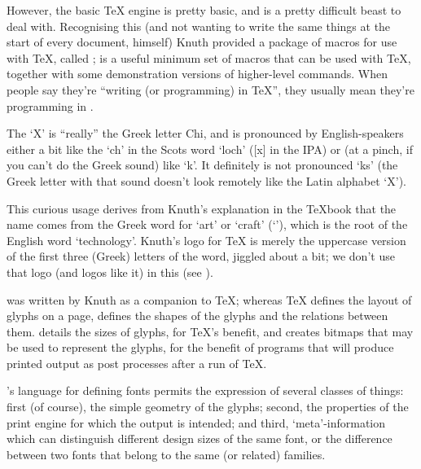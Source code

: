 However, the basic \TeX{} engine is pretty
basic, and is a pretty difficult beast to deal with. Recognising this
(and not wanting to write the same things at the start of every
document, himself) Knuth provided a package of macros for use with
\TeX{}, called \plaintex{}; \plaintex{} is a useful minimum set of
macros that can be used with \TeX{}, together with some demonstration
versions of higher-level commands.  When people say they're ``writing
(or programming) in \TeX{}'', they usually mean they're programming in
\plaintex{}.


The `X' is ``really'' the Greek letter %
Chi, and is pronounced by
English-speakers either a bit like the `ch' in the Scots word `loch'
([x] in the IPA) or (at a pinch, if you can't do the Greek sound) like
`k'.  It definitely is not pronounced `ks' (the Greek letter with that
sound doesn't look remotely like the Latin alphabet `X').

This curious usage derives from Knuth's explanation in the \TeX{}book
that the name comes from the Greek word for `art' or `craft'
(`'),
which is the root of the English word `technology'.  Knuth's logo for \TeX{} is
merely the uppercase version of the first three (Greek) letters of the
word, jiggled about a bit; we don't use that logo (and logos like it)
in this  (see %
).


\MF{} was written by Knuth as a companion to \TeX{}; whereas \TeX{}
defines the layout of glyphs on a page, \MF{} defines the shapes of
the glyphs and the relations between them.  \MF{} details the sizes of
glyphs, for \TeX{}'s benefit, and creates bitmaps that may be used to
represent the glyphs, for the benefit of programs that will produce
printed output as post processes after a run of \TeX{}.

\MF{}'s language for defining fonts permits the expression of several
classes of things: first (of course), the simple geometry of the
glyphs; second, the properties of the print engine for which the
output is intended; and third, `meta'-information which can
distinguish different design sizes of the same font, or the difference
between two fonts that belong to the same (or related) families.

